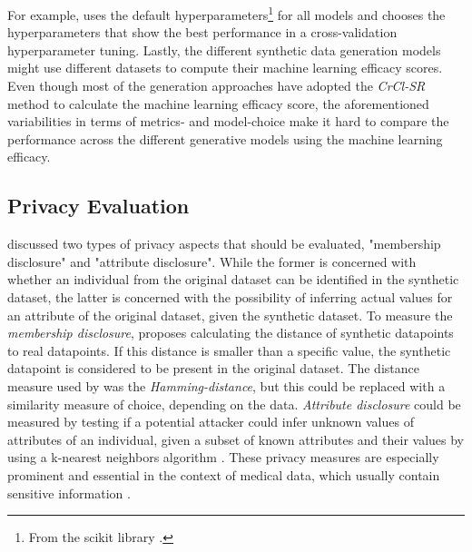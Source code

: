 For example, \cite{kunar2021DTGANDifferentialPrivatea} uses the default hyperparameters\footnote{From the scikit library \cite{scikit-learn}.} for all models and 
\cite{kim2021OCTGANNeuralODEbased} chooses the hyperparameters that show the best performance in a cross-validation hyperparameter tuning.
Lastly, the different synthetic data generation models might use different datasets to compute their machine learning efficacy scores.
Even though most of the generation approaches have adopted the \textit{CrCl-SR} \cite{goncalves2020GenerationEvaluationSynthetic} method to calculate the machine learning efficacy score,
the aforementioned variabilities in terms of metrics- and model-choice make it hard to compare the performance across the different generative models using the machine learning efficacy.

\subsection{Privacy Evaluation}
\label{ch:preliminaries-evaluationOfSyntheticTabularData-privacyEvaluation}
\textcite[p. 7f.]{goncalves2020GenerationEvaluationSynthetic} discussed two types of privacy aspects that should be evaluated, "membership disclosure" and "attribute disclosure".
While the former is concerned with whether an individual from the original dataset can be identified in the synthetic dataset, the latter is concerned with the possibility of inferring actual values for an attribute of the original dataset, given the synthetic dataset.
To measure the \textit{membership disclosure}, \cite{goncalves2020GenerationEvaluationSynthetic} proposes calculating the distance of synthetic datapoints to real datapoints.
If this distance is smaller than a specific value, the synthetic datapoint is considered to be present in the original dataset.
The distance measure used by \cite{goncalves2020GenerationEvaluationSynthetic} was the \textit{Hamming-distance}, but this could be replaced with a similarity measure of choice, depending on the data.
\textit{Attribute disclosure} could be measured by testing if a potential attacker could infer unknown values of attributes of an individual, given a subset of known attributes and their values by using a k-nearest neighbors algorithm \cite{goncalves2020GenerationEvaluationSynthetic}.
These privacy measures are especially prominent and essential in the context of medical data, which usually contain sensitive information \cite{goncalves2020GenerationEvaluationSynthetic, choi2017GeneratingMultilabelDiscrete}.

